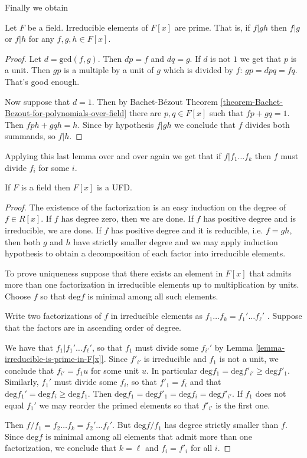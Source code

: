 Finally we obtain

\begin{lemma}
\label{lemma-irreducible-is-prime-in-F[x]}
Let $F$ be a field. Irreducible elements of $F[x]$ are prime. That is, if $f|gh$
then $f|g$ or $f|h$ for any $f,g,h \in F[x]$.
\end{lemma}

\begin{proof}
Let $d=\text{gcd}(f,g)$. Then $dp=f$ and $dq=g$. If $d$ is not $1$ 
we get that $p$ is a unit. Then $gp$ is a multiple by a unit of $g$ which is
divided by $f$: $gp=dpq=fq$. That's good enough.

Now suppose that $d=1$. Then by Bachet-Bézout Theorem
\ref{theorem-Bachet-Bezout-for-polynomials-over-field} 
there are $p,q \in F[x]$ such that $fp+gq=1$. Then $fph+gqh=h$. Since by
hypothesis $f|gh$ we conclude that $f$ divides both summands, so $f|h$.
\end{proof}

Applying this last lemma over and over again we get that if $f|f_1\ldots f_k$
then $f$ must divide $f_i$ for some $i$.

\begin{lemma}
\label{lemma-polynomials-over-fields-are-UFD}
If $F$ is a field then $F[x]$ is a UFD.
\end{lemma}

\begin{proof}
The existence of the factorization is an easy induction on the degree of $f\in
R[x]$. If $f$ has degree zero, then we are done. If $f$ has positive degree and
is irreducible, we are done. If $f$ has positive degree and it is reducible,
i.e. $f=gh$, then both $g$ and $h$ have strictly smaller degree and we may apply
induction hypothesis to obtain a decomposition of each factor into irreducible
elements.

To prove uniqueness suppose that there exists an element in $F[x]$ that admits
more than one factorization in irreducible elements 
up to multiplication by units. Choose $f$ so that
$\text{deg}f$ is minimal among all such elements.

Write two factorizations of $f$ in irreducible elements as 
$f_1\ldots f_k=f_1'\ldots f_\ell'$ . Suppose that the factors are in
ascending order of degree.

We have that $f_1|f_1'\ldots f_\ell'$, so
that $f_1$ must divide some $f_{i'}'$ 
by Lemma \ref{lemma-irreducible-is-prime-in-F[x]}. 
Since $f'_{i'}$ is irreducible and $f_1$ is
not a unit, we conclude that $f_{i'}=f_1 u$ for some unit $u$. In particular
$\text{deg}f_1 =\text{deg}f'_{i'}\geq \text{deg}f'_1$. 
Similarly, $f_1'$ must divide some $f_i$, so that $f'_1=f_i$ and
that $\text{deg}f_1'=\text{deg}f_{i}\geq \text{deg}f_1$. 
Then $\text{deg}f_1=\text{deg}f'_1=\text{deg}f_i=\text{deg}f'_{i'}$. 
If $f_1$ does not equal $f_1'$ we may reorder the primed elements so that 
$f'_{i'}$ is the first one.

Then $f/f_1=f_2\ldots f_k=f_2'\ldots f_{\ell}'$. But $\text{deg}f/f_1$ has
degree strictly smaller than $f$. Since $\text{deg}f$ is minimal among all
elements that admit more than one factorization, we conclude that $k=\ell$ and
$f_i=f'_i$ for all $i$.
\end{proof}


